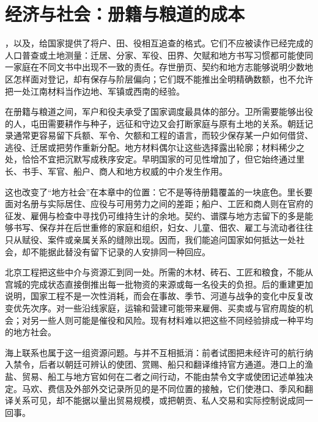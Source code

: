 \section{经济与社会：册籍与粮道的成本}

，以及，给国家提供了将户、田、役相互追查的格式。它们不应被读作已经完成的人口普查或土地测量：迁居、分家、军役、田界、欠赋和地方书写习惯都可能使同一家庭在不同文书中出现不一致的责任。存世册页、契约和地方志能够说明少数地区怎样面对登记，却有保存与阶层偏向；它们既不能推出全明精确数额，也不允许把一处江南材料当作边地、军镇或西南的经验。

在册籍与粮道之间，军户和役夫承受了国家调度最具体的部分。卫所需要能够出役的人，屯田需要耕作与种子，远征和守边又会打断家庭与原有土地的关系。朝廷记录通常更容易留下兵额、军令、欠额和工程的语言，而较少保存某一户如何借贷、逃役、迁居或把劳作重新分配。地方材料偶尔让这些选择露出轮廓；材料稀少之处，恰恰不宜把沉默写成秩序安定。早明国家的可见性增加了，但它始终通过里长、书手、军官、船户、商人和地方权威的中介发生作用。

这也改变了“地方社会”在本章中的位置：它不是等待册籍覆盖的一块底色。里长要面对名册与实际居住、应役与可用劳力之间的差距；船户、工匠和商人则在官府的征发、雇佣与检查中寻找仍可维持生计的余地。契约、谱牒与地方志留下的多是能够书写、保存并在后世重修的家庭和组织，妇女、儿童、佃农、雇工与流动者往往只从赋役、案件或亲属关系的缝隙出现。因而，我们能追问国家如何抵达一处社会，却不能据此替没有留下记录的人安排同一种回应。

北京工程把这些中介与资源汇到同一处。所需的木材、砖石、工匠和粮食，不能从宫城的完成状态直接倒推出每一批物资的来源或每一名役夫的负担。后的重建更加说明，国家工程不是一次性消耗，而会在事故、季节、河道与战争的变化中反复改变优先次序。对一些沿线家庭，运输和营建可能带来雇佣、买卖或与官府周旋的机会；对另一些人则可能是催役和风险。现有材料难以把这些不同经验排成一种平均的地方社会。

海上联系也属于这一组资源问题。与并不互相抵消：前者试图把未经许可的航行纳入禁令，后者以朝廷可辨认的使团、赏赐、船只和翻译维持官方通道。港口上的渔盐、贸易、船工与地方官如何在二者之间行动，不能由禁令文字或使团记述单独决定。马欢、费信及外部外交记录所见的是不同位置的接触，它们使港口、季风和翻译关系可见，却不能据以量出贸易规模，或把朝贡、私人交易和实际控制说成同一回事。

